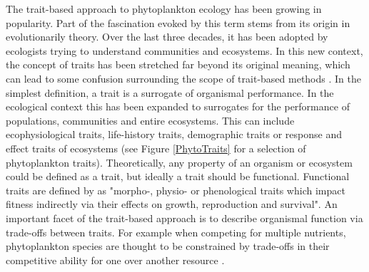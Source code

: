The trait-based approach to phytoplankton ecology has been growing in popularity. Part of the fascination evoked by this term stems from its origin in evolutionarily theory. Over the last three decades, it has been adopted by ecologists trying to understand communities and ecosystems. In this new context, the concept of traits has been stretched far beyond its original meaning,
 which can lead to some confusion surrounding the scope of trait-based methods \citep{Violle2007c}. In the simplest definition, a trait is a surrogate of organismal performance. In the ecological context this has been expanded to surrogates for the performance of populations, communities and entire ecosystems. This can include ecophysiological traits, life-history traits, demographic traits or response and effect traits of ecosystems (see Figure \ref{PhytoTraits} for a selection of phytoplankton traits).
  Theoretically, any property of an organism or ecosystem could be defined as a trait, but ideally a trait should be functional. 
  Functional traits are defined by \cite{Violle2007c} as "morpho-, physio- or phenological traits which impact fitness indirectly via their effects on growth, reproduction and survival". 
   An important facet of the trait-based approach is to describe organismal function via trade-offs between traits. For example when competing for multiple nutrients, phytoplankton species are thought to be constrained by trade-offs in their competitive ability for one over another resource \citep{Tilman1990}. 

